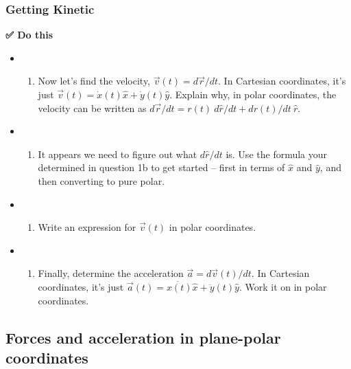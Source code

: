 \subsubsection{Getting Kinetic}\label{getting-kinetic}

\textbf{✅ Do this}

\begin{itemize}
\tightlist
\item
  \begin{enumerate}
  \def\labelenumi{(\alph{enumi})}
  \tightlist
  \item
    Now let's find the velocity, \(\vec{v}(t) = d\vec{r}/dt\). In
    Cartesian coordinates, it's just
    \(\vec{v}(t) = \dot{x}(t)\hat{x} + \dot{y}(t)\hat{y}\). Explain why,
    in polar coordinates, the velocity can be written as
    \(d\vec{r}/dt = r(t)\:d\hat{r}/dt + dr(t)/dt\:\hat{r}\).
  \end{enumerate}
\item
  \begin{enumerate}
  \def\labelenumi{(\alph{enumi})}
  \setcounter{enumi}{1}
  \tightlist
  \item
    It appears we need to figure out what \(d\hat{r}/dt\) is. Use the
    formula your determined in question 1b to get started -- first in
    terms of \(\hat{x}\) and \(\hat{y}\), and then converting to pure
    polar.
  \end{enumerate}
\item
  \begin{enumerate}
  \def\labelenumi{(\alph{enumi})}
  \setcounter{enumi}{2}
  \tightlist
  \item
    Write an expression for \(\vec{v}(t)\) in polar coordinates.
  \end{enumerate}
\item
  \begin{enumerate}
  \def\labelenumi{(\alph{enumi})}
  \setcounter{enumi}{3}
  \tightlist
  \item
    Finally, determine the acceleration \(\vec{a} = d\vec{v}(t)/dt\). In
    Cartesian coordinates, it's just
    \(\vec{a}(t) = \ddot{x(t)}\hat{x} + \ddot{y}(t)\hat{y}\). Work it on
    in polar coordinates.
  \end{enumerate}
\end{itemize}

\subsection{Forces and acceleration in plane-polar
coordinates}\label{forces-and-acceleration-in-plane-polar-coordinates}

